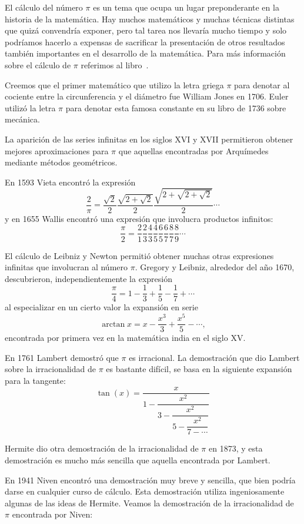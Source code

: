El cálculo del número $\pi$ es un tema que ocupa un lugar preponderante en la
historia de la matemática. Hay muchos matemáticos y muchas técnicas distintas
que quizá convendría exponer, pero tal tarea nos llevaría mucho tiempo y solo
podríamos hacerlo a expensas de sacrificar la presentación de otros resultados
también importantes en el desarrollo de la matemática. Para más información
sobre el cálculo de $\pi$ referimos al libro~\cite{MR0449960}. 

Creemos que el primer matemático que utilizo la letra griega $\pi$ para denotar
al cociente entre la circunferencia y el diámetro fue William Jones en 1706.
Euler utilizó la letra $\pi$ para denotar esta famosa constante en su libro de
1736 sobre mecánica. 

La aparición de las series infinitas en los siglos XVI y XVII permitieron
obtener mejores aproximaciones para $\pi$ que aquellas encontradas por
Arquímedes mediante métodos geométricos. 

\label{Vieta}
\label{Wallis}
En 1593 Vieta encontró la
expresión
\[
	\frac{2}{\pi}=\dfrac{\sqrt{2}}{2}\dfrac{\sqrt{2+\sqrt{2}}}{2}\dfrac{\sqrt{2+\sqrt{2+\sqrt{2}}}}{2}\cdots
\]
y en 1655 Wallis encontró una expresión que involucra productos infinitos:
\[
	\frac{\pi}{2}=\frac21\frac23\frac43\frac45\frac65\frac67\frac87\frac89\cdots
\]

\label{LeibnizGregory}
El cálculo de Leibniz y Newton permitió obtener muchas otras expresiones
infinitas que involucran al número $\pi$. Gregory y Leibniz, alrededor del año
1670, descubrieron, independientemente la expresión
\[
	\frac{\pi}{4}=1-\frac13+\frac15-\frac17+\cdots
\]
al especializar en un cierto valor la expansión en serie 
\[
	\arctan x=x-\frac{x^3}{3}+\frac{x^5}{5}-\cdots,
\]
encontrada por primera vez en la matemática india en el siglo XV.

En 1761 Lambert demostró que $\pi$ es irracional.  La demostración que dio
Lambert sobre la irracionalidad de $\pi$ es bastante difícil, se basa en la
siguiente expansión para la tangente:
\[
	\tan(x)=\dfrac{x}{1-\dfrac{x^2}{3-\dfrac{x^2}{5-\dfrac{x^2}{7-\cdots}}}}
\]

Hermite dio otra demostración de la irracionalidad de $\pi$ en 1873, y esta
demostración es mucho más sencilla que aquella encontrada por Lambert. 

En 1941 Niven encontró una demostración muy breve y sencilla, que bien podría
darse en cualquier curso de cálculo. Esta demostración utiliza ingeniosamente
algunas de las ideas de Hermite. Veamos la demostración de la irracionalidad de
$\pi$ encontrada por Niven:

